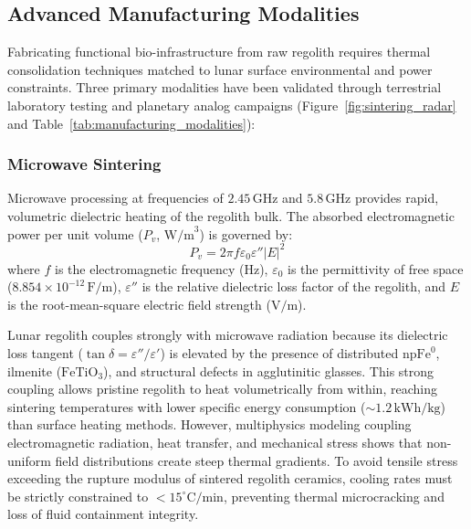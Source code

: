\subsection{Advanced Manufacturing Modalities}
\label{subsec:modalities}

Fabricating functional bio-infrastructure from raw regolith requires thermal consolidation techniques matched to lunar surface environmental and power constraints\cite{ming1989lunar,fateri2019solar,goulas2017process}. Three primary modalities have been validated through terrestrial laboratory testing and planetary analog campaigns (Figure~\ref{fig:sintering_radar} and Table~\ref{tab:manufacturing_modalities}):

\subsubsection{Microwave Sintering}
Microwave processing at frequencies of $2.45\,\mathrm{GHz}$ and $5.8\,\mathrm{GHz}$ provides rapid, volumetric dielectric heating of the regolith bulk\cite{taylor2005microwave,xi2026multiphysics,lim2019numerical}. The absorbed electromagnetic power per unit volume ($P_v$, $\mathrm{W/m}^3$) is governed by:
\begin{equation}
    P_v = 2\pi f \varepsilon_0 \varepsilon'' |E|^2
    \label{eq:microwave_heating}
\end{equation}
where $f$ is the electromagnetic frequency ($\mathrm{Hz}$), $\varepsilon_0$ is the permittivity of free space ($8.854 \times 10^{-12}\,\mathrm{F/m}$), $\varepsilon''$ is the relative dielectric loss factor of the regolith, and $E$ is the root-mean-square electric field strength ($\mathrm{V/m}$)\cite{taylor2005microwave,xi2026multiphysics,lim2019numerical}.

Lunar regolith couples strongly with microwave radiation because its dielectric loss tangent ($\tan\delta = \varepsilon''/\varepsilon'$) is elevated by the presence of distributed $\mathrm{npFe}^0$, ilmenite ($\mathrm{FeTiO}_3$), and structural defects in agglutinitic glasses\cite{taylor2005microwave,ramossomolinos2024electromagnetic}. This strong coupling allows pristine regolith to heat volumetrically from within, reaching sintering temperatures with lower specific energy consumption ($\sim 1.2\,\mathrm{kWh/kg}$) than surface heating methods\cite{taylor2005microwave,lim2019numerical}. However, multiphysics modeling coupling electromagnetic radiation, heat transfer, and mechanical stress shows that non-uniform field distributions create steep thermal gradients\cite{xi2026multiphysics}. To avoid tensile stress exceeding the rupture modulus of sintered regolith ceramics, cooling rates must be strictly constrained to $<15^\circ\mathrm{C/min}$, preventing thermal microcracking and loss of fluid containment integrity\cite{xi2026multiphysics}.

